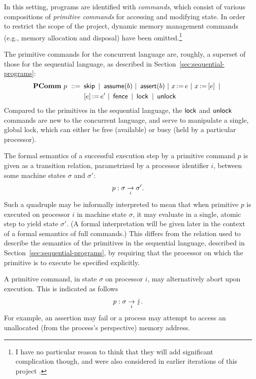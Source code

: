 \documentclass[11pt]{report}
\begin{document}
In this setting, programs are identified with \emph{commands}, which consist of various compositions of \emph{primitive commands} for accessing and modifying state. In order to restrict the scope of the project, dynamic memory management commands (e.g., memory allocation and disposal) have been omitted.\footnote{I have no particular reason to think that they will add significant complication though, and were also considered in earlier iterations of this project \cite{wmsldetails,lola11}.}

The primitive commands for the concurrent language are, roughly, a superset of those for the sequential language, as described in Section~\ref{sec:sequential-programs}: \begin{align*} \mathbf{PComm}~p ~::=~ & \operatorname{\mathsf{skip}} ~|~ \operatorname{\mathsf{assume}}(b) ~|~ \operatorname{\mathsf{assert}}(b) ~|~ x \operatorname{:\!=} e ~|~ x \operatorname{:\!=} \left[ e \right] ~|~ \\ 
	& \left[ e \right] \operatorname{:\!=} e' ~|~ \operatorname{\mathsf{fence}} ~|~ \operatorname{\mathsf{lock}} ~|~ \operatorname{\mathsf{unlock}} 	
\end{align*} Compared to the primitives in the sequential language, the $\operatorname{\mathsf{lock}}$ and $\operatorname{\mathsf{unlock}}$ commands are new to the concurrent language, and serve to manipulate a single, global lock, which can either be free (available) or busy (held by a particular processor). 

The formal semantics of a successful execution step by a primitive command $p$ is given as a transition relation, parametrized by a processor identifier $i$, between some machine states $\sigma$ and $\sigma'$: \[ p : \sigma \underset{i}{\rightarrow} \sigma'. \] Such a quadruple may be informally interpreted to mean that when primitive $p$ is executed on processor $i$ in machine state $\sigma$, it may evaluate in a single, atomic step to yield state $\sigma'$. (A formal interpretation will be given later in the context of a formal semantics of full commands.) This differs from the relation used to describe the semantics of the primitives in the sequential language, described in Section~\ref{sec:sequential-programs}, by requiring that the processor on which the primitive is to execute be specified explicitly. 

A primitive command, in state $\sigma$ on processor $i$, may alternatively abort upon execution. This is indicated as follows \[ p : \sigma \underset{i}{\rightarrow} \lightning. \] For example, an assertion may fail or a process may attempt to access an unallocated (from the process's perspective) memory address. 
\end{document}
